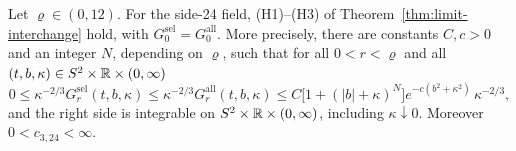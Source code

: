 \begin{proposition}\label{prop:limit-hypotheses}
Let $\varrho\in(0,12)$. For the side-24 field, (H1)--(H3) of Theorem~\ref{thm:limit-interchange} hold, with $G^{\mathrm{sel}}_0=G^{\mathrm{all}}_0$. More precisely, there are constants $C,c>0$ and an integer $N$, depending on $\varrho$, such that for all $0<r<\varrho$ and all $(t,b,\kappa)\in S^2\times\mathbb R\times(0,\infty)$
\begin{equation}\label{eq:limit-majorant}
0\le\kappa^{-2/3}G^{\mathrm{sel}}_r(t,b,\kappa)\le\kappa^{-2/3}G^{\mathrm{all}}_r(t,b,\kappa)\le C\bigl[1+(|b|+\kappa)^N\bigr]e^{-c(b^2+\kappa^2)}\,\kappa^{-2/3},
\end{equation}
and the right side is integrable on $S^2\times\mathbb R\times(0,\infty)$, including $\kappa\downarrow0$. Moreover $0<c_{3,24}<\infty$.
\end{proposition}

